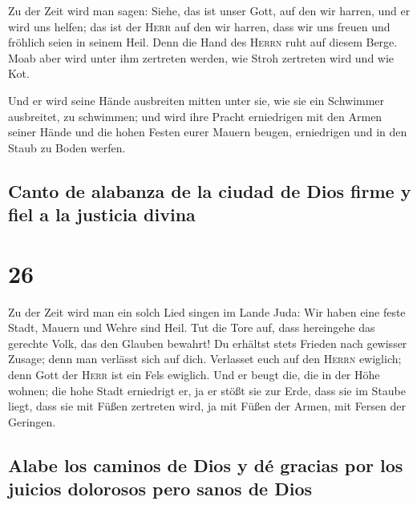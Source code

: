  Zu der Zeit wird man sagen: Siehe, das ist unser Gott,
auf den wir harren, und er wird uns helfen; das ist der \textsc{Herr}
auf den wir harren, dass wir uns freuen und fröhlich seien in seinem
Heil.  Denn die Hand des \textsc{Herrn} ruht auf diesem
Berge. Moab aber wird unter ihm zertreten werden, wie Stroh zertreten
wird und wie Kot.

 Und er wird seine Hände ausbreiten mitten unter sie, wie
sie ein Schwimmer ausbreitet, zu schwimmen; und wird ihre Pracht
erniedrigen mit den Armen seiner Hände  und die hohen
Festen eurer Mauern beugen, erniedrigen und in den Staub zu Boden
werfen.

\hypertarget{canto-de-alabanza-de-la-ciudad-de-dios-firme-y-fiel-a-la-justicia-divina}{%
\subsection{Canto de alabanza de la ciudad de Dios firme y fiel a la
justicia
divina}\label{canto-de-alabanza-de-la-ciudad-de-dios-firme-y-fiel-a-la-justicia-divina}}

\hypertarget{section-25}{%
\section{26}\label{section-25}}

 Zu der Zeit wird man ein solch Lied singen im Lande Juda:
Wir haben eine feste Stadt, Mauern und Wehre sind Heil. 
Tut die Tore auf, dass hereingehe das gerechte Volk, das den Glauben
bewahrt!  Du erhältst stets Frieden nach gewisser Zusage;
denn man verlässt sich auf dich.  Verlasset euch auf den
\textsc{Herrn} ewiglich; denn Gott der \textsc{Herr} ist ein Fels
ewiglich.  Und er beugt die, die in der Höhe wohnen; die
hohe Stadt erniedrigt er, ja er stößt sie zur Erde, dass sie im Staube
liegt,  dass sie mit Füßen zertreten wird, ja mit Füßen
der Armen, mit Fersen der Geringen.

\hypertarget{alabe-los-caminos-de-dios-y-duxe9-gracias-por-los-juicios-dolorosos-pero-sanos-de-dios}{%
\subsection{Alabe los caminos de Dios y dé gracias por los juicios
dolorosos pero sanos de
Dios}\label{alabe-los-caminos-de-dios-y-duxe9-gracias-por-los-juicios-dolorosos-pero-sanos-de-dios}}

